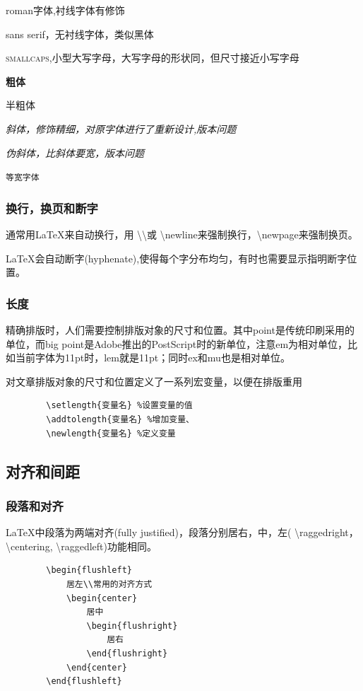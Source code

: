 \documentclass[16pt]{article}
\begin{document}
\textrm{roman字体,衬线字体有修饰} \par
\textsf{sans serif，无衬线字体，类似黑体} \par
\textsc{smallcaps,小型大写字母，大写字母的形状同，但尺寸接近小写字母} \par
\textbf{粗体}   \par
\textmd{半粗体} \par
\textit{斜体，修饰精细，对原字体进行了重新设计,版本问题} \par
\textsl{伪斜体，比斜体要宽，版本问题}   \par
\texttt{等宽字体}


\subsubsection{换行，换页和断字}
通常用\LaTeX{}来自动换行，用 \textbackslash \textbackslash 或 \textbackslash newline来强制换行，\textbackslash newpage来强制换页。 \par
\LaTeX{}会自动断字(hyphenate),使得每个字分布均匀，有时也需要显示指明断字位置。

\subsubsection{长度}
精确排版时，人们需要控制排版对象的尺寸和位置。其中point是传统印刷采用的单位，而big point是Adobe推出的PostScript时的新单位，注意em为相对单位，比如当前字体为11pt时，lem就是11pt；同时ex和mu也是相对单位。 \par
对文章排版对象的尺寸和位置定义了一系列宏变量，以便在排版重用
\begin{lstlisting}
        \setlength{变量名} %设置变量的值
        \addtolength{变量名} %增加变量、
        \newlength{变量名} %定义变量
    \end{lstlisting}

\subsection{对齐和间距}
\subsubsection{段落和对齐}
\LaTeX{}中段落为两端对齐(fully justified)，段落分别居右，中，左( \textbackslash raggedright， \textbackslash centering, \textbackslash raggedleft)功能相同。
\begin{lstlisting}
        \begin{flushleft}
            居左\\常用的对齐方式
            \begin{center}
                居中
                \begin{flushright}
                    居右
                \end{flushright}
            \end{center}
        \end{flushleft}
    \end{lstlisting}
\end{document}
